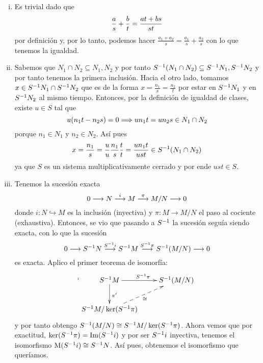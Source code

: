 \documentclass[../../../main.tex]{subfiles}
\begin{document}
\begin{sol}
\begin{enumerate}[(i)]
    \item Es trivial dado que
    \begin{equation}
        \notag
        \frac{a}{s}+\frac{b}{t} = \frac{at+bs}{st}
    \end{equation}
    por definición y, por lo tanto, podemos hacer $\frac{a_1+a_2}{s} = \frac{a_1}{s}+\frac{a_2}{s}$ con lo que tenemos la igualdad.
    
    \item Sabemos que $N_1\cap N_2\subseteq N_1,N_2$ y por tanto $S^{-1}(N_1\cap N_2)\subseteq S^{-1} N_1,S^{-1} N_2$ y por tanto tenemos la primera inclusión. Hacia el otro lado, tomamos $x\in S^{-1} N_1\cap S^{-1} N_2$ que es de la forma $x = \frac{n_1}{s} = \frac{n_2}{t}$ por estar en $S^{-1} N_1$ y en $S^{-1} N_2$ al mismo tiempo. Entonces, por la definición de igualdad de clases, existe $u\in S$ tal que
    \begin{equation}
        \notag
        u(n_1t-n_2s) = 0\Longrightarrow un_1t = un_2s\in N_1\cap N_2
    \end{equation}
    porque $n_1\in N_1$ y $n_2\in N_2$. Así pues
    \begin{equation}
        \notag
        x = \frac{n_1}{s} = \frac{u}{u}\frac{n_1}{s}\frac{t}{t} = \frac{un_1t}{ust}\in S^{-1} (N_1\cap N_2)
    \end{equation}
    ya que $S$ es un sistema multiplicativamente cerrado y por ende $ust\in S$.
    \item Tenemos la sucesión exacta
    \begin{equation}
        \notag
        0\longrightarrow N\overset{i}{\longrightarrow}M\overset{\pi}{\longrightarrow} M/N\longrightarrow 0
    \end{equation}
    donde $i:N\hookrightarrow M$ es la inclusión (inyectiva) y $\pi:M\to M/N$ el paso al cociente (exhaustiva). Entonces, se vio que pasando a $S^{-1}$ la sucesión seguía siendo exacta, con lo que la sucesión
    \begin{equation}
        \notag
        0\longrightarrow S^{-1} N\overset{S^{-1} i}{\longrightarrow}S^{-1} M\overset{S^{-1} \pi}{\longrightarrow} S^{-1} (M/N)\longrightarrow 0
    \end{equation}
    es exacta. Aplico el primer teorema de isomorfía:
    \begin{equation}
        \notag`
        \xymatrix{
        \localized M \ar[r]^{\localized \pi}\ar[d]^{\pi'} & \localized(M/N)\\
        \localized M/\ker(\localized \pi)\ar@{-->}[ur]_\cong & 
        }
    \end{equation}
    y por tanto obtengo $S^{-1} (M/N)\cong S^{-1} M/\ker(S^{-1} \pi)$. Ahora vemos que por exactitud, $\ker(S^{-1} \pi) = \mathrm{Im}(S^{-1} i)$ y por ser $S^{-1} i$ inyectiva, tenemos el isomorfismo $\mathrm{M}(S^{-1} i)\cong S^{-1} N$. Así pues, obtenemos el isomorfismo que queríamos.
    

\end{enumerate}
\end{sol}
\end{document}
